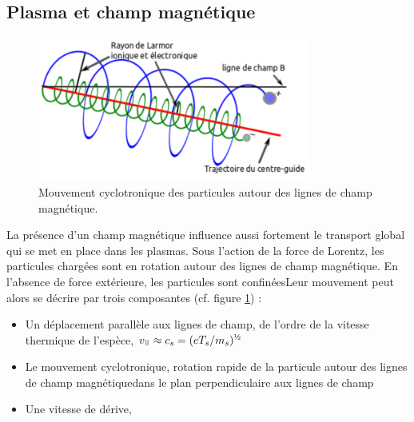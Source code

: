		\subsection{Plasma et champ magnétique}
			\begin{figure}
				\centering
				\includegraphics[width=0.8\textwidth]{figures/mouvementCyclotron.png}
				{\caption{Mouvement cyclotronique des particules autour des lignes de champ
				magnétique.}\label{1-particleDrifts}}
			\end{figure}
			La présence d'un champ magnétique influence aussi fortement le transport global qui 
			se met en place dans les plasmas. Sous l'action de la force de Lorentz, les particules 
			chargées sont en rotation autour des lignes de champ magnétique. En l'absence de force 
			extérieure, les particules sont confinéesLeur mouvement peut alors
			se décrire par trois composantes (cf. figure \ref{1-particleDrifts}) :			
			\begin{itemize}
			\item Un déplacement parallèle aux lignes de champ, de l'ordre de la vitesse
			thermique de l'espèce, $v_\para\approx c_s=(eT_s/m_s)^{\text{\textonehalf}}$
			\item Le mouvement cyclotronique, rotation rapide de la particule
			autour des lignes de champ magnétiquedans le plan perpendiculaire aux lignes
			de champ
			\item Une vitesse de dérive, 
			\end{itemize}
			\
			
